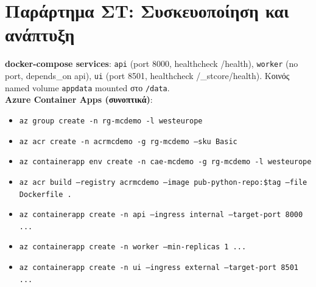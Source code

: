 \documentclass[12pt]{article}
\begin{document}
\section{Παράρτημα ΣΤ: Συσκευοποίηση και ανάπτυξη}
\textbf{docker-compose services}: \texttt{api} (port 8000, healthcheck /health), \texttt{worker} (no port, depends\_on api), \texttt{ui} (port 8501, healthcheck /\_stcore/health). Κοινός named volume \texttt{appdata} mounted στο \texttt{/data}.\\
\textbf{Azure Container Apps (συνοπτικά)}:
\begin{itemize}
  \item \texttt{az group create -n rg-mcdemo -l westeurope}
  \item \texttt{az acr create -n acrmcdemo -g rg-mcdemo --sku Basic}
  \item \texttt{az containerapp env create -n cae-mcdemo -g rg-mcdemo -l westeurope}
  \item \texttt{az acr build --registry acrmcdemo --image pub-python-repo:\$tag --file Dockerfile .}
  \item \texttt{az containerapp create -n api  --ingress internal --target-port 8000 ...}
  \item \texttt{az containerapp create -n worker --min-replicas 1 ...}
  \item \texttt{az containerapp create -n ui   --ingress external --target-port 8501 ...}
\end{itemize}

\newpage
\end{document}
